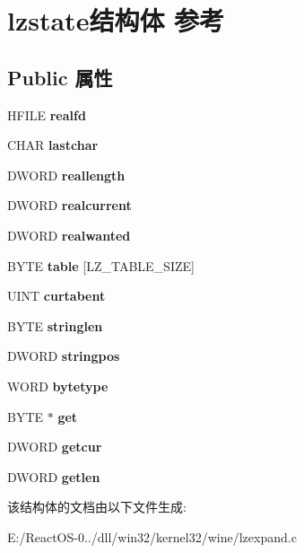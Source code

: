 \hypertarget{structlzstate}{}\section{lzstate结构体 参考}
\label{structlzstate}
\subsection*{Public 属性}
\begin{DoxyCompactItemize}
\item 
\mbox{\label{structlzstate_ad12a88d3763ed826a2126360a26b5bb7}} 
H\+F\+I\+LE {\bfseries realfd}
\item 
\mbox{\label{structlzstate_a52042e42686d5555f6e7f5bb5735289f}} 
C\+H\+AR {\bfseries lastchar}
\item 
\mbox{\label{structlzstate_a63e159b1062c8837b801ff09d0134514}} 
D\+W\+O\+RD {\bfseries reallength}
\item 
\mbox{\label{structlzstate_a510e8875c90179aba1c45f5af82b6dd1}} 
D\+W\+O\+RD {\bfseries realcurrent}
\item 
\mbox{\label{structlzstate_ac60237cf1708eba3ebf395d5800b87d5}} 
D\+W\+O\+RD {\bfseries realwanted}
\item 
\mbox{\label{structlzstate_a126dbac3d588a7851ce786bf018bcdb5}} 
B\+Y\+TE {\bfseries table} \mbox{[}L\+Z\+\_\+\+T\+A\+B\+L\+E\+\_\+\+S\+I\+ZE\mbox{]}
\item 
\mbox{\label{structlzstate_ab6f91288d706c26ac99fa83ecd2d834b}} 
U\+I\+NT {\bfseries curtabent}
\item 
\mbox{\label{structlzstate_a2c0222c45d4394ed22084c7099599241}} 
B\+Y\+TE {\bfseries stringlen}
\item 
\mbox{\label{structlzstate_aa660c7c29d5395a9803d82a9e5947966}} 
D\+W\+O\+RD {\bfseries stringpos}
\item 
\mbox{\label{structlzstate_a572085f265e2308362c5bbc82bfa0188}} 
W\+O\+RD {\bfseries bytetype}
\item 
\mbox{\label{structlzstate_a4ca122ffded6a5f7120b33e12e9b07fb}} 
B\+Y\+TE $\ast$ {\bfseries get}
\item 
\mbox{\label{structlzstate_aa203b280ffd61392abc821a0f403f567}} 
D\+W\+O\+RD {\bfseries getcur}
\item 
\mbox{\label{structlzstate_ad770d698db37f081ac1e5bf926b010f3}} 
D\+W\+O\+RD {\bfseries getlen}
\end{DoxyCompactItemize}


该结构体的文档由以下文件生成\+:\begin{DoxyCompactItemize}
\item 
E\+:/\+React\+O\+S-\/0../dll/win32/kernel32/wine/lzexpand.\+c\end{DoxyCompactItemize}
